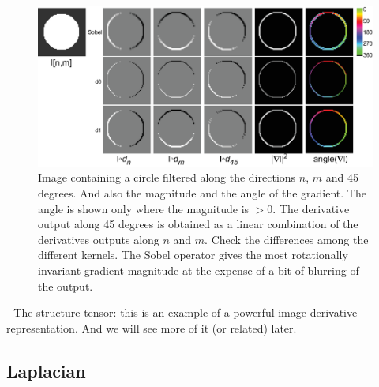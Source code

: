  
\begin{figure}
\centerline{
\includegraphics[width=1\linewidth]{figures/spatial_filters/circle.eps}}
\caption{Image containing a circle filtered along the directions $n$, $m$ and 45 degrees. And also the magnitude and the angle of the gradient. The angle is shown only where the magnitude is $>0$. The derivative output along 45 degrees is obtained as a linear combination of the derivatives outputs along $n$ and $m$. Check the differences among the different kernels. The Sobel operator gives the most rotationally invariant gradient magnitude at the expense of a bit of blurring of the output.} 
\label{fig:circle}
\end{figure}


 
- The structure tensor: this is an example of a powerful image derivative representation. And we will see more of it (or related) later.


\subsection{Laplacian}


